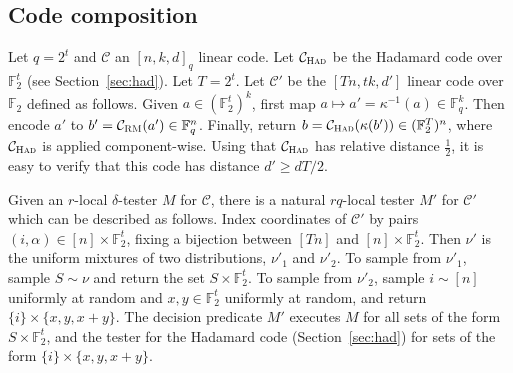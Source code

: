 \documentclass[11pt]{article}
\theoremstyle{definition}
\newtheorem{definition}[theorem]{Definition}
\newcommand{\code}{\mathcal{C}}
\newcommand{\N}{\ensuremath{\mathbb{N}}}
\newcommand{\F}{\ensuremath{\mathbb{F}}}
\newcommand{\mC}{\ensuremath{\mathcal{C}}}
\newcommand{\RM}{\ensuremath{\textsc{RM}}}
\newcommand{\Had}{\ensuremath{\textsc{Had}}}
\newcommand{\eps}{\varepsilon}
\begin{document}
%
%
%

\subsection{Code composition}
\label{sec:code-comp}

Let $q=2^t$ and $\code$ an $[n,k,d]_q$ linear code. Let $\code_{\Had}$ be the Hadamard code over $\F_2^t$ (see Section~\ref{sec:had}). Let $T=2^t$.
Let $\mC'$ be the $[Tn,tk,d']$ linear code over $\F_2$ defined as follows. Given $a\in (\F_2^t)^{k}$, first map $a\mapsto a'=\kappa^{-1}(a) \in \F_q^{k}$. Then encode $a'$ to $b'=\code_\RM(a')\in \F_q^n$. Finally, return $b=\code_\Had(\kappa(b'))\in(\F_2^T)^n$, where $\code_\Had$ is applied component-wise. Using that $\code_\Had$ has relative distance $\frac{1}{2}$, it is easy to verify that this code has distance $d'\geq dT/2$.

Given an $r$-local $\delta$-tester $M$ for $\code$, there is a natural $rq$-local tester $M'$ for $\code'$ which can be described as follows. Index coordinates of $\code'$ by pairs $(i,\alpha)\in [n]\times\F_2^t$, fixing a bijection between $[Tn]$ and $[n]\times \F_2^t$. Then $\nu'$ is the uniform mixtures of two distributions, $\nu'_1$ and $\nu'_2$. To sample from $\nu'_1$, sample $S\sim\nu$ and return the set $S\times\F_2^t$. To sample from $\nu'_2$, sample $i\sim[n]$ uniformly at random and $x,y\in\F_2^t$ uniformly at random, and return $\{i\}\times\{x,y,x+y\}$. The decision predicate $M'$ executes $M$ for all sets of the form $S\times \F_2^t$, and the tester for the Hadamard code (Section~\ref{sec:had}) for sets of the form $\{i\}\times\{x,y,x+y\}$.
\end{document}

